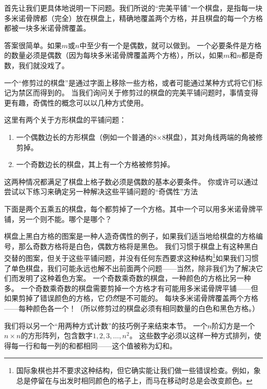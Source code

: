 首先让我们更具体地说明一下问题。我们所说的“完美平铺”一个棋盘，是指每一块多米诺骨牌都（完全）放在棋盘上，精确地覆盖两个方格，并且棋盘的每一个方格都被一块多米诺骨牌覆盖。

答案很简单。如果$m$或$n$中至少有一个是偶数，就可以做到。
一个必要条件是方格的数量必须是偶数（因为每块多米诺骨牌覆盖两个方格），所以，如果$m$和$n$都是奇数，我们就没戏了。

一个“修剪过的棋盘”是通过字面上移除一些方格，或者可能通过某种方式将它们标记为禁区而得到的。
当我们询问关于修剪过的棋盘的完美平铺问题时，事情变得更有趣，奇偶性的概念可以以几种方式使用。

这里有两个关于方形棋盘的平铺问题：

\begin{enumerate}
\item 一个偶数边长的方形棋盘（例如一个普通的8×8棋盘），其对角线两端的角被修剪掉。
\item 一个奇数边长的棋盘，其上有一个方格被修剪掉。
\end{enumerate} 

这两种情况都满足了棋盘上格子数必须是偶数的基本必要条件。
你或许可以通过尝试以下练习来确定另一种解决这些平铺问题的“奇偶性”方法

\begin{exer}
下面是两个五乘五的棋盘，每个都剪掉了一个方格。其中一个可以用多米诺骨牌平铺，另一个则不能。哪个是哪个？
\begin{center}

\end{center}
\end{exer}

棋盘上黑白方格的图案是一种人造奇偶性的例子，如果我们适当地给棋盘的方格编号，那么奇数方格将是白色，偶数方格将是黑色。
我们习惯于棋盘上有这种黑白交替的图案，但关于这些平铺问题，并没有任何东西要求这种结构\footnote{国际象棋也并不要求这种结构，但它确实能让我们做一些错误检查。例如，象总是停留在与出发时相同颜色的格子上，而马在移动时总是会改变颜色。}如果我们习惯了单色棋盘，我们可能永远也解不出前面两个问题——当然，除非我们为了解决它们而发明了这种着色方案。
一个奇数乘奇数的棋盘，一种颜色的方格比另一种多。
一个奇数乘奇数的棋盘需要剪掉一个方格才有可能用多米诺骨牌平铺——但如果剪掉了错误颜色的方格，它\emph{仍然}是不可能的。
每块多米诺骨牌覆盖两个方格——每种颜色各一个！（所以修剪过的棋盘必须有相同数量的白色和黑色方格。）

我们将以另一个“用两种方式计数”的技巧例子来结束本节。
一个$n$阶幻方是一个$n \times n$的方形阵列，包含数字$1, 2, 3, \ldots , n^2$。
这些数字必须以这样一种方式排列，使得每一行和每一列的和都相同——这个值被称为幻和。

